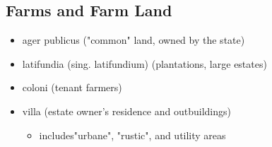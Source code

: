 \documentclass[12pt, twoside]{article}
\begin{document}
\subsection{Farms and Farm Land}
\begin{itemize}
\item ager publicus ("common" land, owned by the state)
\item latifundia (sing. latifundium) (plantations, large estates)
\item coloni (tenant farmers)
\item villa (estate owner's residence and outbuildings)
	\begin{itemize}
	\item includes"urbane", "rustic", and utility areas
	\end{itemize}
\end{itemize}
\end{document}
